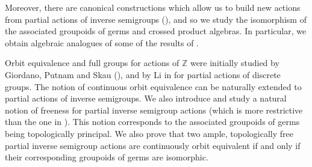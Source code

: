 Moreover, there are canonical constructions which allow us to build new actions from partial actions of inverse semigroups (\cite{MR2419901,MR3231479}), and so we study the isomorphism of the associated groupoids of germs and crossed product algebras. In particular, we obtain algebraic analogues of some of the results of \cite{MR3231226}.



Orbit equivalence and full groups for actions of $\mathbb{Z}$ were initially studied by Giordano, Putnam and Skau (\cite{MR1363826, MR1710743,MR2054051}), and by Li in \cite{MR3789176,MR3694599} for partial actions of discrete groups. The notion of continuous orbit equivalence can be naturally extended to partial actions of inverse semigroups. We also introduce and study a natural notion of freeness for partial inverse semigroup actions (which is more restrictive than the one in \cite{MR3448414}). This notion corresponds to the associated groupoids of germs being topologically principal. We also prove that two ample, topologically free partial inverse semigroup actions are continuously orbit equivalent if and only if their corresponding groupoids of germs are isomorphic.%
\nocite{MR2876963,MR3377390}%
\nocite{MR2861532}%